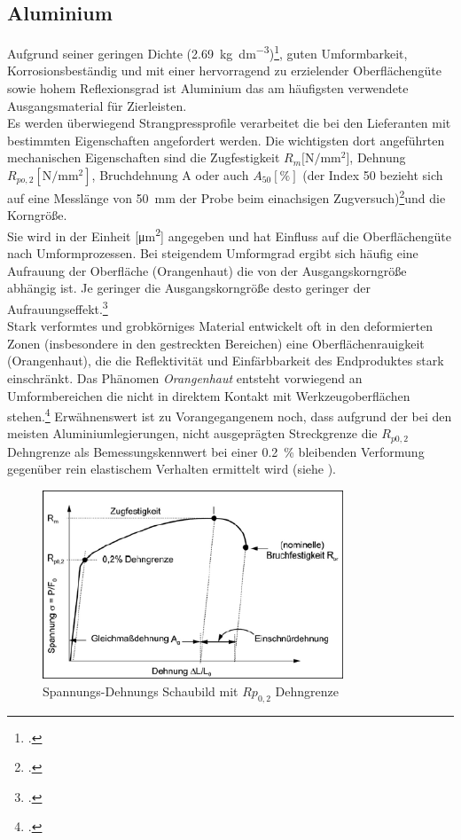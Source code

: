 \documentclass[12pt,a4paper,parskip]{scrartcl}
\begin{document}
\subsection{Aluminium}
Aufgrund seiner geringen Dichte (\SI{2.69}{\kilo\gram\per\deci\meter\cubed})\footcite[Vgl.][353]{wm}, guten Umformbarkeit, Korrosionsbeständig und mit einer hervorragend zu erzielender Oberflächengüte sowie hohem Reflexionsgrad ist Aluminium das am häufigsten verwendete Ausgangsmaterial für Zierleisten.\\
 Es werden überwiegend Strangpressprofile verarbeitet die bei den Lieferanten mit bestimmten Eigenschaften angefordert werden. Die wichtigsten dort angeführten mechanischen Eigenschaften sind die Zugfestigkeit $R_m  [\si{\newton\per\milli\meter\squared}$], Dehnung $R_{po,2} [\si{\newton\per\milli\meter\squared}]$,   Bruchdehnung A oder auch $A_{50} [\si{\percent}]$ (der Index 50 bezieht sich auf eine Messlänge  von \SI{50}{\milli\meter} der Probe  beim einachsigen Zugversuch)\footcite[Vgl.][281]{aa}und die Korngröße.\\
  Sie wird in der Einheit [\si{\micro\meter\squared}] angegeben und hat Einfluss auf die Oberflächengüte nach  Umformprozessen. Bei steigendem Umformgrad ergibt sich häufig eine Aufrauung der Oberfläche (Orangenhaut)\label{sec:orangenhaut} die von der Ausgangskorngröße abhängig ist. Je geringer die Ausgangskorngröße desto geringer der Aufrauungseffekt.\footcite[Vgl.][524]{aa}\\ Stark verformtes und grobkörniges Material entwickelt oft in den deformierten Zonen (insbesondere in den gestreckten Bereichen) eine Oberflächenrauigkeit (Orangenhaut), die die Reflektivität und Einfärbbarkeit des Endproduktes stark einschränkt. Das Phänomen \emph{Orangenhaut} entsteht vorwiegend an Umformbereichen die nicht in direktem Kontakt mit Werkzeugoberflächen stehen.\footcite[Vgl.][19]{hmp}
Erwähnenswert ist zu Vorangegangenem noch, dass aufgrund der bei den meisten Aluminiumlegierungen, nicht ausgeprägten Streckgrenze  die $R_{p0,2}$ Dehngrenze als Bemessungskennwert bei einer \SI{0.2}{\percent} bleibenden Verformung gegenüber rein elastischem Verhalten ermittelt wird (siehe ).
\begin{figure}[hbtp]
\centering
 	\includegraphics[width=0.8\textwidth]{spanndehn2}
 	\caption[Spannungs-Dehnungs Schaubild]{Spannungs-Dehnungs Schaubild mit $Rp_{0,2} $ Dehngrenze\protect\footnotemark}
 	\label{fig:spanndehn2}
 	\end{figure}
	 	 	 	 
\end{document}
